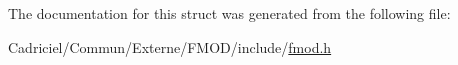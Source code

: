 

The documentation for this struct was generated from the following file\-:\begin{DoxyCompactItemize}
\item 
Cadriciel/\-Commun/\-Externe/\-F\-M\-O\-D/include/\hyperlink{fmod_8h}{fmod.\-h}\end{DoxyCompactItemize}
